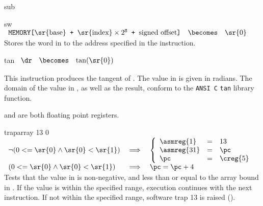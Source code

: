 \begin{instruction}{sub}
\end{instruction}


\begin{instruction}{sw}
     {\swopc}
     {
       \begin{math}
         \begin{array}{lcl}
           \texttt{MEMORY[\textrm{\sr{base}} + \(\textrm{\sr{index}}
               \times 2^\texttt{S}\) +  \textrm{signed offset}]}
           & \becomes & {\sr{0}}
         \end{array}
       \end{math}
     }
     {
       Stores the word in  to the address specified in the instruction.
     }
\end{instruction}


\begin{instruction}{tan}
   {\tanopc} { \begin{math} \begin{array}{lcl} \dr
     & \becomes & \tan(\sr{0}) \end{array} \end{math} } {This
     instruction produces the tangent of \texttt{}.  The value
     in  is given in radians.  The domain of the value
     in \texttt{}, as well as the result, conform to
     the \texttt{ANSI C} \texttt{tan} library function.

      and \dr are both floating point registers.}
\end{instruction}


\begin{instruction}{traparray}\label{inst:traparray}
     {13}
     {0}
     { %
       \begin{math}
         \begin{array}{lcl}
           \neg (0 <= \sr{0} \wedge \sr{0} < \sr{1}) & \implies &
           \left\lbrace
           \begin{array}{lcl}
             \asmreg{1} & = & 13 \\
             \asmreg{31} & = & \pc \\
             \pc & = & \creg{5} \\
           \end{array}
           \right. \\

           (0 <= \sr{0} \wedge \sr{0} < \sr{1}) & \implies & \pc = \pc + 4 \\
         \end{array}
       \end{math}
     }
     {
       Tests that the value in  is non-negative, and less than
       or equal to the array bound in .  If the value is within
       the specified range, execution continues with the next
       instruction.  If not within the specified range, software trap
       13 is raised ().
     }
\end{instruction}


